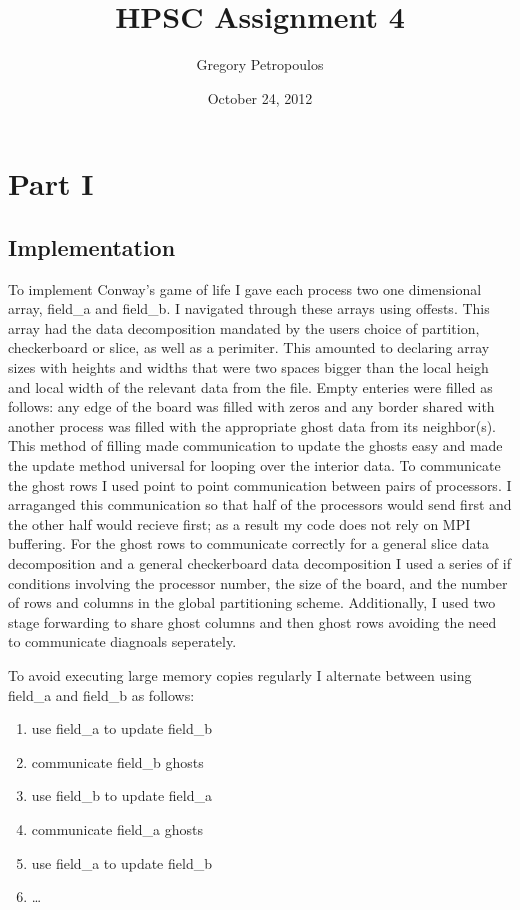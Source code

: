\documentclass[11pt,a4paper,oneside]{report}
\begin{document}
\title{HPSC Assignment 4}
\author{Gregory Petropoulos}
\date{October 24, 2012}
\maketitle

\section{Part I}
\subsection{Implementation}
To implement Conway's game of life I gave each process two one dimensional array, field\_a and field\_b. 
I navigated through these arrays using offests.  
This array had the data decomposition mandated by the users choice of partition, checkerboard or slice, as well as a perimiter.  
This amounted to declaring array sizes with heights and widths that were two spaces bigger than the local heigh and local width of the relevant data from the file. 
Empty enteries were filled as follows:  any edge of the board was filled with zeros and any border shared with another process was filled with the appropriate ghost data from its neighbor(s).  
This method of filling made communication to update the ghosts easy and made the update method universal for looping over the interior data.  
To communicate the ghost rows I used point to point communication between pairs of processors.  
I arraganged this communication so that half of the processors would send first and the other half would recieve first; as a result my code does not rely on MPI buffering.
For the ghost rows to communicate correctly for a general slice data decomposition and a general checkerboard data decomposition I used a series of if conditions involving the processor number, the size of the board, and the number of rows and columns in the global partitioning scheme.  
Additionally, I used two stage forwarding to share ghost columns and then ghost rows avoiding the need to communicate diagnoals seperately.  

To avoid executing large memory copies regularly I alternate between using field\_a and field\_b as follows:

\begin{enumerate}
  \item use field\_a to update field\_b
  \item communicate field\_b ghosts
  \item use field\_b to update field\_a
  \item communicate field\_a ghosts
  \item use field\_a to update field\_b
  \item \dots
\end{enumerate}
\end{document}
